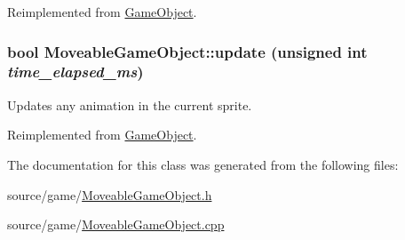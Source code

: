 Reimplemented from \hyperlink{classGameObject_abb64143e72358beb808db22182517802}{GameObject}.

\hypertarget{classMoveableGameObject_af2a5d981743e85b4bd35a90f874b361b}{
\subsubsection[{update}]{\setlength{\rightskip}{0pt plus 5cm}bool MoveableGameObject::update (unsigned int {\em time\_\-elapsed\_\-ms})}}
\label{classMoveableGameObject_af2a5d981743e85b4bd35a90f874b361b}
Updates any animation in the current sprite. 

Reimplemented from \hyperlink{classGameObject_ad2f3cd5d1f5a11b237507cd3ee98b95d}{GameObject}.



The documentation for this class was generated from the following files:\begin{DoxyCompactItemize}
\item 
source/game/\hyperlink{MoveableGameObject_8h}{MoveableGameObject.h}\item 
source/game/\hyperlink{MoveableGameObject_8cpp}{MoveableGameObject.cpp}\end{DoxyCompactItemize}
